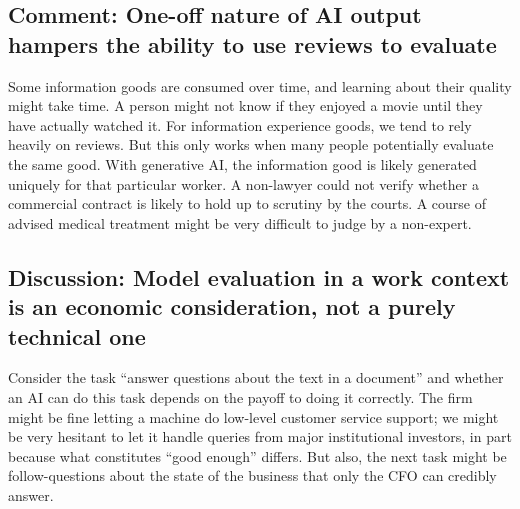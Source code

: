 \documentclass{article}
\begin{document}
\begin{tcolorbox}
\subsection{Comment: One-off nature of AI output hampers the ability to use reviews to evaluate}
  Some information goods are consumed over time, and learning about their quality might take time. 
A person might not know if they enjoyed a movie until they have actually watched it. 
For information experience goods, we tend to rely heavily on reviews. 
But this only works when many people potentially evaluate the same good. 
With generative AI, the information good is likely generated uniquely for that particular worker. 
A non-lawyer could not verify whether a commercial contract is likely to hold up to scrutiny by the courts. 
A course of advised medical treatment might be very difficult to judge by a non-expert.
\end{tcolorbox}

\begin{tcolorbox}
\subsection{Discussion: Model evaluation in a work context is an economic consideration, not a purely technical one}
Consider the task ``answer questions about the text in a document'' and whether an AI can do this task depends on the payoff to doing it correctly. 
The firm might be fine letting a machine do low-level customer service support; we might be very hesitant to let it handle queries from major institutional investors, in part because what constitutes ``good enough'' differs.
But also, the next task might be follow-questions about the state of the business that only the CFO can credibly answer.
\end{tcolorbox}
\end{document}
